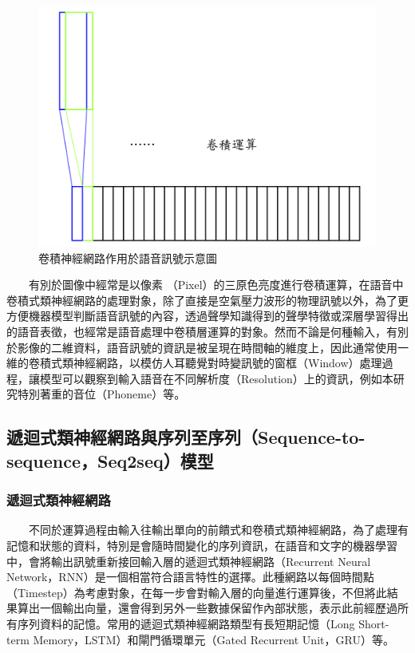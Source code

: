 \begin{figure}
    \centering
    \includegraphics[width=0.5\linewidth]{figures/speechCNN.png}
    \caption{卷積神經網路作用於語音訊號示意圖}
    \label{fig:speech-cnn}
\end{figure}

　　有別於圖像中經常是以像素 （Pixel）的三原色亮度進行卷積運算，在語音中卷積式類神經網路的處理對象，除了直接是空氣壓力波形的物理訊號以外，為了更方便機器模型判斷語音訊號的內容，透過聲學知識得到的聲學特徵或深層學習得出的語音表徵，也經常是語音處理中卷積層運算的對象。然而不論是何種輸入，有別於影像的二維資料，語音訊號的資訊是被呈現在時間軸的維度上，因此通常使用一維的卷積式類神經網路，以模仿人耳聽覺對時變訊號的窗框（Window）處理過程，讓模型可以觀察到輸入語音在不同解析度（Resolution）上的資訊，例如本研究特別著重的音位（Phoneme）等。



\subsection{遞迴式類神經網路與序列至序列（Sequence-to-sequence，Seq2seq）模型}

\subsubsection{遞迴式類神經網路}

　　不同於運算過程由輸入往輸出單向的前饋式和卷積式類神經網路，為了處理有記憶和狀態的資料，特別是會隨時間變化的序列資訊，在語音和文字的機器學習中，會將輸出訊號重新接回輸入層的遞迴式類神經網路（Recurrent Neural Network，RNN）是一個相當符合語言特性的選擇。此種網路以每個時間點（Timestep）為考慮對象，在每一步會對輸入層的向量進行運算後，不但將此結果算出一個輸出向量，還會得到另外一些數據保留作內部狀態，表示此前經歷過所有序列資料的記憶。常用的遞迴式類神經網路類型有長短期記憶（Long Short-term Memory，LSTM）和閘門循環單元（Gated Recurrent Unit，GRU）等。
  
